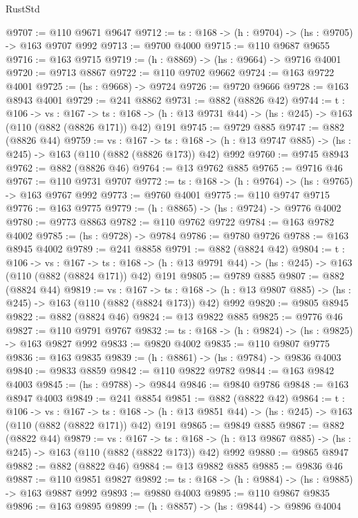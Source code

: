\begin{lexlean}{RustStd}
\begin{coremodule}
@9707 := @110 @9671 @9647
@9712 := {ts : @168} -> (h : @9704) -> (hs : @9705) -> @163 @9707 @992
@9713 := @9700 @4000
@9715 := @110 @9687 @9655
@9716 := @163 @9715
@9719 := (h : @8869) -> (hs : @9664) -> @9716 @4001
@9720 := @9713 @8867
@9722 := @110 @9702 @9662
@9724 := @163 @9722 @4001
@9725 := (hs : @9668) -> @9724
@9726 := @9720 @9666
@9728 := @163 @8943 @4001
@9729 := @241 @8862
@9731 := @882 (@8826 @42)
@9744 := {t : @106} ->
  {vs : @167} ->
  {ts : @168} -> (h : @13 @9731 @44) -> (hs : @245) -> @163 (@110 (@882 (@8826 @171)) @42) @191
@9745 := @9729 @885
@9747 := @882 (@8826 @44)
@9759 := {vs : @167} ->
  {ts : @168} -> (h : @13 @9747 @885) -> (hs : @245) -> @163 (@110 (@882 (@8826 @173)) @42) @992
@9760 := @9745 @8943
@9762 := @882 (@8826 @46)
@9764 := @13 @9762 @885
@9765 := @9716 @46
@9767 := @110 @9731 @9707
@9772 := {ts : @168} -> (h : @9764) -> (hs : @9765) -> @163 @9767 @992
@9773 := @9760 @4001
@9775 := @110 @9747 @9715
@9776 := @163 @9775
@9779 := (h : @8865) -> (hs : @9724) -> @9776 @4002
@9780 := @9773 @8863
@9782 := @110 @9762 @9722
@9784 := @163 @9782 @4002
@9785 := (hs : @9728) -> @9784
@9786 := @9780 @9726
@9788 := @163 @8945 @4002
@9789 := @241 @8858
@9791 := @882 (@8824 @42)
@9804 := {t : @106} ->
  {vs : @167} ->
  {ts : @168} -> (h : @13 @9791 @44) -> (hs : @245) -> @163 (@110 (@882 (@8824 @171)) @42) @191
@9805 := @9789 @885
@9807 := @882 (@8824 @44)
@9819 := {vs : @167} ->
  {ts : @168} -> (h : @13 @9807 @885) -> (hs : @245) -> @163 (@110 (@882 (@8824 @173)) @42) @992
@9820 := @9805 @8945
@9822 := @882 (@8824 @46)
@9824 := @13 @9822 @885
@9825 := @9776 @46
@9827 := @110 @9791 @9767
@9832 := {ts : @168} -> (h : @9824) -> (hs : @9825) -> @163 @9827 @992
@9833 := @9820 @4002
@9835 := @110 @9807 @9775
@9836 := @163 @9835
@9839 := (h : @8861) -> (hs : @9784) -> @9836 @4003
@9840 := @9833 @8859
@9842 := @110 @9822 @9782
@9844 := @163 @9842 @4003
@9845 := (hs : @9788) -> @9844
@9846 := @9840 @9786
@9848 := @163 @8947 @4003
@9849 := @241 @8854
@9851 := @882 (@8822 @42)
@9864 := {t : @106} ->
  {vs : @167} ->
  {ts : @168} -> (h : @13 @9851 @44) -> (hs : @245) -> @163 (@110 (@882 (@8822 @171)) @42) @191
@9865 := @9849 @885
@9867 := @882 (@8822 @44)
@9879 := {vs : @167} ->
  {ts : @168} -> (h : @13 @9867 @885) -> (hs : @245) -> @163 (@110 (@882 (@8822 @173)) @42) @992
@9880 := @9865 @8947
@9882 := @882 (@8822 @46)
@9884 := @13 @9882 @885
@9885 := @9836 @46
@9887 := @110 @9851 @9827
@9892 := {ts : @168} -> (h : @9884) -> (hs : @9885) -> @163 @9887 @992
@9893 := @9880 @4003
@9895 := @110 @9867 @9835
@9896 := @163 @9895
@9899 := (h : @8857) -> (hs : @9844) -> @9896 @4004

\end{coremodule}
\end{lexlean}
